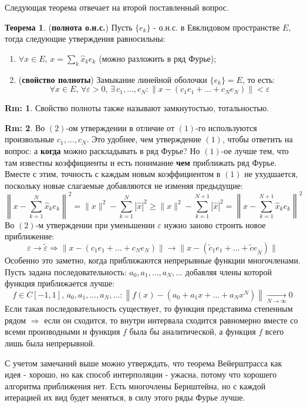 \documentclass[12pt]{article}
\newcommand{\VE}{\varepsilon}
\theoremstyle{definition}
\newtheorem{rem}{Rm:}
\newtheorem{theorem}{Теорема}
\newcommand{\ddsum}[2]{\displaystyle\sum\limits_{#1}^{#2}}
\newcommand{\wte}[1]{\widetilde{#1}}
\begin{document}
Следующая теорема отвечает на второй поставленный вопрос.
\begin{theorem}(\textbf{полнота о.н.с.})
	Пусть $\{e_k\}$ - о.н.с. в Евклидовом пространстве $E$, тогда следующие утверждения равносильны:
	\begin{enumerate}[label=(\arabic*)]
		\item $\forall x \in E,\, x =\ddsum{k}{}\hat{x}_k e_k$ (можно разложить в ряд Фурье);
		\item (\textbf{свойство полноты}) Замыкание линейной оболочки $\{e_k\} = E$, то есть:
		$$
			\forall x \in E, \, \forall \VE > 0, \, \exists \, c_1,\dotsc,c_N \colon \|x - (c_1 e_1 + \dotsc + c_N e_N)\| < \VE
		$$
	\end{enumerate}
\end{theorem}
\begin{rem}
	Свойство полноты также называют замкнутостью, тотальностью. 
\end{rem}
\begin{rem}
	Во $(2)$-ом утверждении в отличие от $(1)$-го используются произвольные $c_1, \dotsc, c_N$. Это удобнее, чем утверждение $(1)$, чтобы ответить на вопрос: а \textbf{когда} можно раскладывать в ряд Фурье? Но $(1)$-ое лучше тем, что там известны коэффициенты и есть понимание \textbf{чем} приближать ряд Фурье. Вместе с этим, точность с каждым новым коэффициентом в $(1)$ не ухудшается, поскольку новые слагаемые добавляются не изменяя предыдущие:
	$$
		\left\|x - \ddsum{k = 1}{N}\hat{x}_k e_k \right\|^2 = \|x\|^2 - \ddsum{k = 1}{N}\left|\hat{x}\right|^2 \geq \|x\|^2 - \ddsum{k = 1}{N+1}\left|\hat{x}\right|^2 = 	\left\|x - \ddsum{k = 1}{N+1}\hat{x}_k e_k \right\|^2
	$$
	Во $(2)$-м утверждении при уменьшении $\VE$ нужно заново строить новое приближение:
	$$
		\VE \to \wte{\VE} \Rightarrow \|x - (c_1 e_1 + \dotsc + c_N e_N)\| \to \|x - (\wte{c}_1 e_1 + \dotsc + \wte{c} e_{\wte{N}})\| 
	$$
	Особенно это заметно, когда приближаются непрерывные функции многочленами. Пусть задана последовательность: $a_0, a_1, \dotsc, a_N, \dotsc$ добавляя члены которой функция приближается лучше:
	$$
		f \in C[-1,1], \, a_0, a_1, \dotsc, a_N, \dotsc \colon \left\|f(x) - \left(a_0 + a_1 x + \dotsc + a_N x^N\right)\right\| \xrightarrow[N \to \infty]{} 0
	$$
	Если такая последовательность существует, то функция представима степенным рядом $\Rightarrow$ если он сходится, то внутри интервала сходится равномерно вместе со всеми производными и функция $f$ была бы аналитической, а функция $f$ всего лишь была непрерывной. 
	
	С учетом замечаний выше можно утверждать, что теорема Вейерштрасса как идея - хорошо, но как способ интерполяции - ужасна, потому что хорошего алгоритма приближения нет. Есть многочлены Бернштейна, но с каждой итерацией их вид будет меняться, в силу этого ряды Фурье лучше.
\end{rem}
\end{document}
